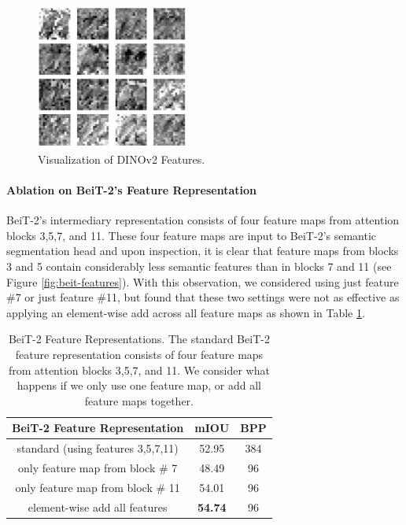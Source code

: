 \documentclass[10pt,twocolumn,letterpaper]{article}
\begin{document}
\begin{figure}
    \centering
    \includegraphics[width=5cm]{Figures/original.png}
    \caption{Visualization of DINOv2 Features.}
    \label{fig:dinov2features}
\end{figure}

\paragraph{Ablation on BeiT-2's Feature Representation}
BeiT-2's intermediary representation consists of four feature maps from attention blocks 3,5,7, and 11. These four feature maps are input to BeiT-2's semantic segmentation head and upon inspection, it is clear that feature maps from blocks 3 and 5 contain considerably less semantic features than in blocks 7 and 11 (see Figure \ref{fig:beit-features}). With this observation, we considered using just feature \#7 or just feature \#11, but found that these two settings were not as effective as applying an element-wise add across all feature maps as shown in Table \ref{tab:beit-feature-representations}.

\begin{table}[]
    \centering
    \begin{tabular}{c|c c}
    BeiT-2 Feature Representation & mIOU & BPP\\
    \hline
       standard (using features 3,5,7,11)  &  52.95 & 384\\
        only feature map from block \# 7 & 48.49 & 96 \\
        only feature map from block \# 11 & 54.01 & 96\\
        element-wise add all features & \textbf{54.74} & 96\\
    \end{tabular}
    \caption{BeiT-2 Feature Representations. The standard BeiT-2 feature representation consists of four feature maps from attention blocks 3,5,7, and 11. We consider what happens if we only use one feature map, or add all feature maps together.}
    \label{tab:beit-feature-representations}
\end{table}
\end{document}
